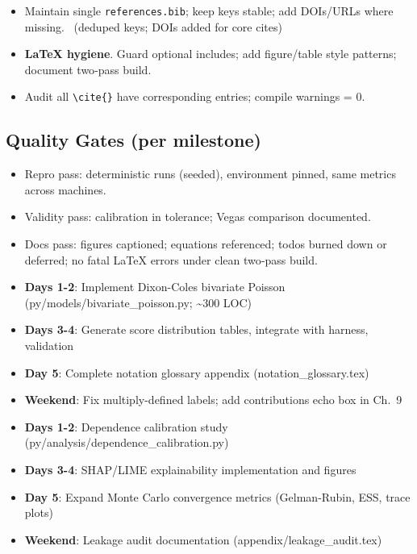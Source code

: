 \begin{itemize}
  \item {} Maintain single \texttt{references.bib}; keep keys stable; add DOIs/URLs where missing. \done\ (deduped keys; DOIs added for core cites)
  \item {} \textbf{LaTeX hygiene}. Guard optional includes; add figure/table style patterns; document two‑pass build. \done
  \item {} Audit all \texttt{\textbackslash cite\{\}} have corresponding entries; compile warnings = 0.
\end{itemize}

\subsection*{Quality Gates (per milestone)}
\begin{itemize}
  \item Repro pass: deterministic runs (seeded), environment pinned, same metrics across machines.
  \item Validity pass: calibration in tolerance; Vegas comparison documented.
  \item Docs pass: figures captioned; equations referenced; todos burned down or deferred; no fatal LaTeX errors under clean two‑pass build.
\end{itemize}


\begin{itemize}
  \item \textbf{Days 1-2}: Implement Dixon-Coles bivariate Poisson (py/models/bivariate\_poisson.py; \textasciitilde300 LOC)
  \item \textbf{Days 3-4}: Generate score distribution tables, integrate with harness, validation
  \item \textbf{Day 5}: Complete notation glossary appendix (notation\_glossary.tex)
  \item \textbf{Weekend}: Fix multiply-defined labels; add contributions echo box in Ch.~9
\end{itemize}

\begin{itemize}
  \item \textbf{Days 1-2}: Dependence calibration study (py/analysis/dependence\_calibration.py)
  \item \textbf{Days 3-4}: SHAP/LIME explainability implementation and figures
  \item \textbf{Day 5}: Expand Monte Carlo convergence metrics (Gelman-Rubin, ESS, trace plots)
  \item \textbf{Weekend}: Leakage audit documentation (appendix/leakage\_audit.tex)
\end{itemize}

